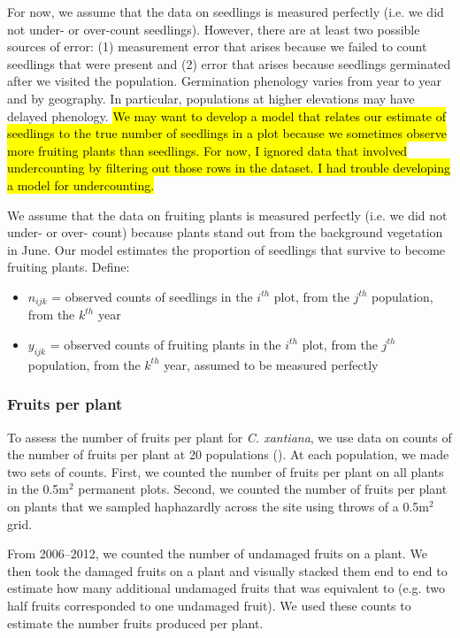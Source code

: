\documentclass[12pt, oneside, titlepage]{article}   	%
\begin{document}
For now, we assume that the data on seedlings is measured perfectly (i.e. we did not under- or over-count seedlings). However, there are at least two possible sources of error: (1) measurement error that arises because we failed to count seedlings that were present and (2) error that arises because seedlings germinated after we visited the population. Germination phenology varies from year to year and by geography. In particular, populations at higher elevations may have delayed phenology. \hl{We may want to develop a model that relates our estimate of seedlings to the true number of seedlings in a plot because we sometimes observe more fruiting plants than seedlings. For now, I ignored data that involved undercounting by filtering out those rows in the dataset. I had trouble developing a model for undercounting. }

We assume that the data on fruiting plants is measured perfectly (i.e. we did not under- or over- count) because plants stand out from the background vegetation in June. Our model estimates the proportion of seedlings that survive to become fruiting plants. Define:

\begin{itemize}
	\item $n_{ijk}$ = observed counts of seedlings in the $i^{th}$ plot, from the $j^{th}$ population, from the $k^{th}$ year
	\item $y_{ijk}$ = observed counts of fruiting plants in the $i^{th}$ plot, from the $j^{th}$ population, from the $k^{th}$ year, assumed to be measured perfectly
\end{itemize}

\subsubsection*{Fruits per plant}

To assess the number of fruits per plant for \textit{C. xantiana}, we use data on counts of the number of fruits per plant at 20 populations (\cite{eckhart2011}). At each population, we made two sets of counts. First, we counted the number of fruits per plant on all plants in the 0.5m$^2$ permanent plots. Second, we counted the number of fruits per plant on plants that we sampled haphazardly across the site using throws of a 0.5m$^2$ grid.

From 2006--2012, we counted the number of undamaged fruits on a plant. We then took the damaged fruits on a plant and visually stacked them end to end to estimate how many additional undamaged fruits that was equivalent to (e.g. two half fruits corresponded to one undamaged fruit). We used these counts to estimate the number fruits produced per plant. 
\end{document}
